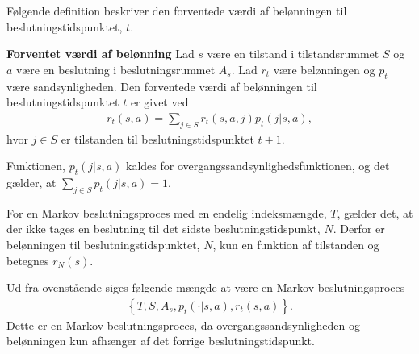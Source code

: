 

Følgende definition beskriver den forventede værdi af belønningen til beslutningstidspunktet, $t$.

\begin{minipage}\textwidth
\begin{defn} \textbf{Forventet værdi af belønning}
\newline
Lad $s$ være en tilstand i tilstandsrummet $S$ og $a$ være en beslutning i beslutningsrummet $A_s$. Lad $r_t$ være belønningen og $p_t$ være sandsynligheden.
Den forventede værdi af belønningen til beslutningstidspunktet $t$ er givet ved
\begin{align*}
    r_t(s,a)=\sum_{j\in S} r_t(s,a,j)p_t(j | s,a),
\end{align*}
hvor $j \in S$ er tilstanden til beslutningstidspunktet $t+1$.
\end{defn}
\end{minipage}



Funktionen, $p_t(j|s,a)$ kaldes for overgangssandsynlighedsfunktionen, og det gælder, at $\displaystyle\sum_{j\in S} p_t(j|s,a)=1$.


For en Markov beslutningsproces med en endelig indeksmængde, $T$, gælder det, at der ikke tages en beslutning til det sidste beslutningstidspunkt, $N$. Derfor er belønningen til beslutningstidspunktet, $N$, kun en funktion af tilstanden og betegnes $r_N(s)$.

Ud fra ovenstående siges følgende mængde at være en Markov beslutningsproces
%
\begin{align*}
    \left\{T, S, A_s, p_t(\cdot | s,a), r_t(s,a)\right\}.
 \end{align*}
Dette er en Markov beslutningsproces, da overgangssandsynligheden og belønningen kun afhænger af det forrige beslutningstidspunkt. 




